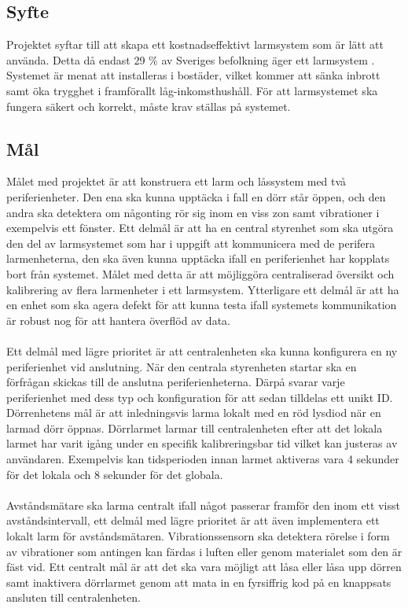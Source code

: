 \documentclass{article}
\begin{document}

\subsection{Syfte}
Projektet syftar till att skapa ett kostnadseffektivt larmsystem som är lätt att använda.
Detta då endast 29 \% av Sveriges befolkning äger ett larmsystem \cite{SSF}.
Systemet är menat att installeras i bostäder, vilket kommer att sänka inbrott samt öka trygghet i framförallt låg-inkomsthushåll.
För att larmsystemet ska fungera säkert och korrekt, måste krav ställas på systemet.

\subsection{Mål}
Målet med projektet är att konstruera ett larm och låssystem med två periferienheter.
Den ena ska kunna upptäcka i fall en dörr står öppen, och den andra ska detektera om någonting rör sig inom en viss zon samt vibrationer i exempelvis ett fönster. 
Ett delmål är att ha en central styrenhet som ska utgöra den del av larmsystemet som har i uppgift att kommunicera med de perifera larmenheterna, den ska även kunna upptäcka ifall en periferienhet har kopplats bort från systemet.
Målet med detta är att möjliggöra centraliserad översikt och kalibrering av flera larmenheter i ett larmsystem.
Ytterligare ett delmål är att ha en enhet som ska agera defekt för att kunna testa ifall systemets kommunikation är robust nog för att hantera överflöd av data.\\
\\
Ett delmål med lägre prioritet är att centralenheten ska kunna konfigurera en ny periferienhet vid anslutning. När den centrala styrenheten startar ska en förfrågan skickas till de anslutna periferienheterna.
Därpå svarar varje periferienhet med dess typ och konfiguration för att sedan tilldelas ett unikt ID.
Dörrenhetens mål är att inledningsvis larma lokalt med en röd lysdiod när en larmad dörr öppnas. 
Dörrlarmet larmar till centralenheten efter att det lokala larmet har varit igång under en specifik kalibreringsbar tid vilket kan justeras av användaren. 
Exempelvis kan tidsperioden innan larmet aktiveras vara 4 sekunder för det lokala och 8 sekunder för det globala.\\
\\
Avståndsmätare ska larma centralt ifall något passerar framför den inom ett visst avståndsintervall, ett delmål med lägre prioritet är att även implementera ett lokalt larm för avståndsmätaren.
Vibrationssensorn ska detektera rörelse i form av vibrationer som antingen kan färdas i luften eller genom materialet som den är fäst vid.
Ett centralt mål är att det ska vara möjligt att låsa eller låsa upp dörren samt inaktivera dörrlarmet genom att mata in en fyrsiffrig kod på en knappsats ansluten till centralenheten.
\end{document}
